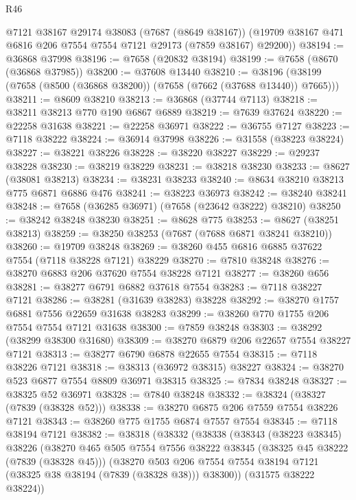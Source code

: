 \begin{lexlean}{R46}
\begin{coremodule}
      @7121
      @38167
      @29174
      @38083
      (@7687 (@8649 @38167))
      (@19709 @38167 @471 @6816 @206 @7554 @7554 @7121 @29173 (@7859 @38167) @29200))
@38194 := @36868 @37998
@38196 := @7658 (@20832 @38194)
@38199 := @7658 (@8670 (@36868 @37985))
@38200 := @37608 @13440
@38210 := @38196 (@38199 (@7658 (@8500 (@36868 @38200)) (@7658 (@7662 (@37688 @13440)) @7665)))
@38211 := @8609 @38210
@38213 := @36868 (@37744 @7113)
@38218 := @38211 @38213 @770 @190 @6867 @6889
@38219 := @7639 @37624
@38220 := @22258 @31638
@38221 := @22258 @36971
@38222 := @36755 @7127
@38223 := @7118 @38222
@38224 := @36914 @37998
@38226 := @31558 (@38223 @38224)
@38227 := @38221 @38226
@38228 := @38220 @38227
@38229 := @29237 @38228
@38230 := @38219 @38229
@38231 := @38218 @38230
@38233 := @8627 (@38081 @38213)
@38234 := @38231 @38233
@38240 := @8634 @38210 @38213 @775 @6871 @6886 @476
@38241 := @38223 @36973
@38242 := @38240 @38241
@38248 := @7658 (@36285 @36971) (@7658 (@23642 @38222) @38210)
@38250 := @38242 @38248 @38230
@38251 := @8628 @775
@38253 := @8627 (@38251 @38213)
@38259 := @38250 @38253 (@7687 (@7688 @6871 @38241 @38210))
@38260 := @19709 @38248
@38269 := @38260 @455 @6816 @6885 @37622 @7554 (@7118 @38228 @7121) @38229
@38270 := @7810 @38248
@38276 := @38270 @6883 @206 @37620 @7554 @38228 @7121
@38277 := @38260 @656
@38281 := @38277 @6791 @6882 @37618 @7554
@38283 := @7118 @38227 @7121
@38286 := @38281 (@31639 @38283) @38228
@38292 := @38270 @1757 @6881 @7556 @22659 @31638 @38283
@38299 := @38260 @770 @1755 @206 @7554 @7554 @7121 @31638
@38300 := @7859 @38248
@38303 := @38292 (@38299 @38300 @31680)
@38309 := @38270 @6879 @206 @22657 @7554 @38227 @7121
@38313 := @38277 @6790 @6878 @22655 @7554
@38315 := @7118 @38226 @7121
@38318 := @38313 (@36972 @38315) @38227
@38324 := @38270 @523 @6877 @7554 @8809 @36971 @38315
@38325 := @7834 @38248
@38327 := @38325 @52 @36971
@38328 := @7840 @38248
@38332 := @38324 (@38327 (@7839 (@38328 @52)))
@38338 := @38270 @6875 @206 @7559 @7554 @38226 @7121
@38343 := @38260 @775 @1755 @6874 @7557 @7554
@38345 := @7118 @38194 @7121
@38382 := @38318
    (@38332
      (@38338
        (@38343
          (@38223 @38345)
          @38226
          (@38270
            @465
            @505
            @7554
            @7556
            @38222
            @38345
            (@38325 @45 @38222 (@7839 (@38328 @45)))
            (@38270
              @503
              @206
              @7554
              @7554
              @38194
              @7121
              (@38325 @38 @38194 (@7839 (@38328 @38)))
              @38300))
          (@31575 @38222 @38224))

\end{coremodule}
\end{lexlean}
